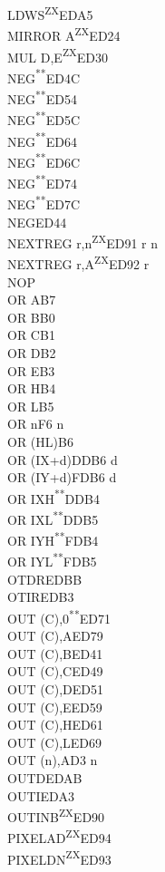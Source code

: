 \documentclass[12pt,twoside,openright,a4paper]{book}
\newcommand{\UNDOC}{\textnormal{\textsuperscript{**}}}
\newcommand{\ZXN}{\textnormal{\textsuperscript{ZX}}}
\begin{document}
\begin{multicols}{3}
{\begin{tabbing}
		LDWS\ZXN\>EDA5\\
		MIRROR A\ZXN\>ED24\\
		MUL D,E\ZXN\>ED30\\
		NEG\UNDOC\>ED4C\\
		NEG\UNDOC\>ED54\\
		NEG\UNDOC\>ED5C\\
		NEG\UNDOC\>ED64\\
		NEG\UNDOC\>ED6C\\
		NEG\UNDOC\>ED74\\
		NEG\UNDOC\>ED7C\\
		NEG\>ED44\\
		NEXTREG r,n\ZXN\>ED91 r n\\
		NEXTREG r,A\ZXN\>ED92 r\\
		NOP\\
		OR A\>B7\\
		OR B\>B0\\
		OR C\>B1\\
		OR D\>B2\\
		OR E\>B3\\
		OR H\>B4\\
		OR L\>B5\\
		OR n\>F6 n\\
		OR (HL)\>B6\\
		OR (IX+d)\>DDB6 d\\
		OR (IY+d)\>FDB6 d\\
		OR IXH\UNDOC\>DDB4\\
		OR IXL\UNDOC\>DDB5\\
		OR IYH\UNDOC\>FDB4\\
		OR IYL\UNDOC\>FDB5\\
		OTDR\>EDBB\\
		OTIR\>EDB3\\
		OUT (C),0\UNDOC\>ED71\\
		OUT (C),A\>ED79\\
		OUT (C),B\>ED41\\
		OUT (C),C\>ED49\\
		OUT (C),D\>ED51\\
		OUT (C),E\>ED59\\
		OUT (C),H\>ED61\\
		OUT (C),L\>ED69\\
		OUT (n),A\>D3 n\\
		OUTD\>EDAB\\
		OUTI\>EDA3\\
		OUTINB\ZXN\>ED90\\
		PIXELAD\ZXN\>ED94\\
		PIXELDN\ZXN\>ED93\\

\end{tabbing}}
\end{multicols}
\end{document}
